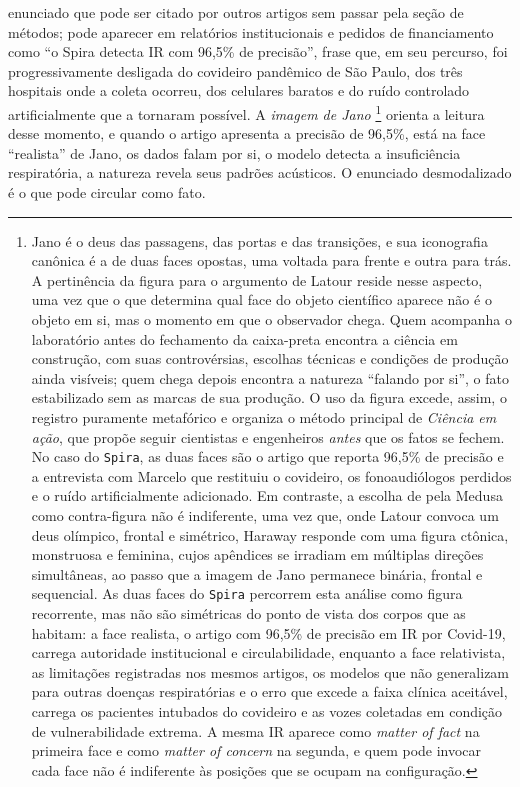 enunciado que pode ser citado por outros artigos sem passar pela seção de métodos; pode aparecer em relatórios institucionais e pedidos de financiamento como \enquote{o Spira detecta IR com 96,5\% de precisão}, frase que, em seu percurso, foi progressivamente desligada do covideiro pandêmico de São Paulo, dos três hospitais onde a coleta ocorreu, dos celulares baratos e do ruído controlado artificialmente que a tornaram possível. A \textit{imagem de Jano} \parencite{Latour2011CienciaEmAcao}\footnote{Jano é o deus das passagens, das portas e das transições, e sua iconografia canônica é a de duas faces opostas, uma voltada para frente e outra para trás. A pertinência da figura para o argumento de Latour reside nesse aspecto, uma vez que o que determina qual face do objeto científico aparece não é o objeto em si, mas o momento em que o observador chega. Quem acompanha o laboratório antes do fechamento da caixa-preta encontra a ciência em construção, com suas controvérsias, escolhas técnicas e condições de produção ainda visíveis; quem chega depois encontra a natureza \enquote{falando por si}, o fato estabilizado sem as marcas de sua produção. O uso da figura excede, assim, o registro puramente metafórico e organiza o método principal de \textit{Ciência em ação}, que propõe seguir cientistas e engenheiros \textit{antes} que os fatos se fechem. No caso do \texttt{Spira}, as duas faces são o artigo que reporta 96,5\% de precisão e a entrevista com Marcelo que restituiu o covideiro, os fonoaudiólogos perdidos e o ruído artificialmente adicionado. Em contraste, a escolha de \textcite{Haraway2016Staying} pela Medusa como contra-figura não é indiferente, uma vez que, onde Latour convoca um deus olímpico, frontal e simétrico, Haraway responde com uma figura ctônica, monstruosa e feminina, cujos apêndices se irradiam em múltiplas direções simultâneas, ao passo que a imagem de Jano permanece binária, frontal e sequencial. As duas faces do \texttt{Spira} percorrem esta análise como figura recorrente, mas não são simétricas do ponto de vista dos corpos que as habitam: a face realista, o artigo com 96,5\% de precisão em IR por Covid-19, carrega autoridade institucional e circulabilidade, enquanto a face relativista, as limitações registradas nos mesmos artigos, os modelos que não generalizam para outras doenças respiratórias e o erro que excede a faixa clínica aceitável, carrega os pacientes intubados do covideiro e as vozes coletadas em condição de vulnerabilidade extrema. A mesma IR aparece como \textit{matter of fact} na primeira face e como \textit{matter of concern} \parencite{latour2004politics} na segunda, e quem pode invocar cada face não é indiferente às posições que se ocupam na configuração.} orienta a leitura desse momento, e quando o artigo apresenta a precisão de 96,5\%, está na face \enquote{realista} de Jano, os dados falam por si, o modelo detecta a insuficiência respiratória, a natureza revela seus padrões acústicos. O enunciado desmodalizado é o que pode circular como fato.


